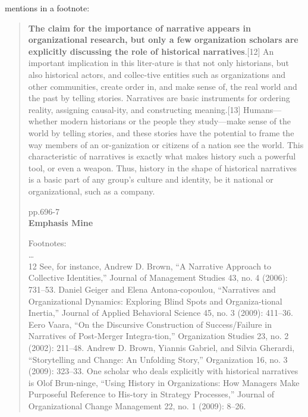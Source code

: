 \cite{hansen2012business} mentions \cite{geiger2009narratives} in a footnote:\\
\begin{quote}
{\bf The claim for the importance of narrative appears in organizational research, but only a few organization scholars are explicitly discussing the role of historical narratives}.[12] An important implication in this liter-ature  is  that  not  only  historians,  but  also  historical  actors,  and  collec-tive entities such as organizations and other communities, create order in,  and  make  sense  of,  the  real  world  and  the  past  by  telling  stories.  Narratives are basic instruments for ordering reality, assigning causal-ity, and constructing meaning.[13] Humans—whether modern historians or  the  people  they  study—make  sense  of  the  world  by  telling  stories,  and these stories have the potential to frame the way members of an or-ganization  or  citizens  of  a  nation  see  the  world.  This  characteristic  of  narratives is exactly what makes history such a powerful tool, or even a weapon.  Thus,  history  in  the  shape  of  historical  narratives  is  a  basic  part of any group’s culture and identity, be it national or organizational, such as a company.\\
\begin{flushright}
pp.696-7 \\
{\bf Emphasis Mine} \\
\end{flushright}

Footnotes:\\

\ldots \\
12  See,  for  instance,  Andrew  D.  Brown,  “A  Narrative  Approach  to  Collective  Identities,”  Journal of Management Studies 43, no. 4 (2006): 731–53. Daniel Geiger and Elena Antona-copoulou,  “Narratives  and  Organizational  Dynamics:  Exploring  Blind  Spots  and  Organiza-tional Inertia,” Journal of Applied Behavioral Science 45, no. 3 (2009): 411–36. Eero Vaara, “On  the  Discursive  Construction  of  Success/Failure  in  Narratives  of  Post-Merger  Integra-tion,” Organization  Studies  23,  no.  2  (2002):  211–48.  Andrew  D.  Brown,  Yiannis  Gabriel,  and Silvia Gherardi, “Storytelling and Change: An Unfolding Story,” Organization 16, no. 3 (2009):  323–33.  One  scholar  who  deals  explicitly  with  historical  narratives  is  Olof  Brun-ninge, “Using History in Organizations: How Managers Make Purposeful Reference to His-tory  in  Strategy  Processes,”  Journal  of  Organizational  Change  Management  22,  no.  1  (2009): 8–26.\\
\end{quote}


